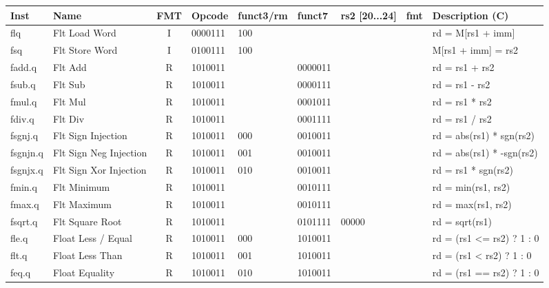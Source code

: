 \begin{center}
\begin{tabular}
{T | l | c | T | T | T | T | T | T } \hline
\rm Inst  & Name                  & FMT   & \rm Opcode & \rm funct3/rm & \rm funct7 & \rm rs2 [20...24] & \rm fmt & \rm Description (C)         \\ \hline
flq       & Flt Load Word         & I     & 0000111    & 100    &        &        & & rd = M[rs1 + imm]    \\
fsq       & Flt Store Word        & I     & 0100111    & 100    &        &        & & M[rs1 + imm] = rs2   \\
\hline
fadd.q    & Flt Add               & R     & 1010011    &        & 0000011 &        & & rd = rs1 + rs2       \\
fsub.q    & Flt Sub               & R     & 1010011    &        & 0000111 &        & & rd = rs1 - rs2       \\
fmul.q    & Flt Mul               & R     & 1010011    &        & 0001011 &        & & rd = rs1 * rs2       \\
fdiv.q    & Flt Div               & R     & 1010011    &        & 0001111 &        & & rd = rs1 / rs2       \\
fsgnj.q   & Flt Sign Injection    & R     & 1010011    & 000    & 0010011 &        & & rd = abs(rs1) * sgn(rs2) \\
fsgnjn.q  & Flt Sign Neg Injection& R     & 1010011    & 001    & 0010011 &        & & rd = abs(rs1) * -sgn(rs2) \\
fsgnjx.q  & Flt Sign Xor Injection& R     & 1010011    & 010    & 0010011 &        & & rd = rs1 * sgn(rs2)  \\
fmin.q    & Flt Minimum           & R     & 1010011    &        & 0010111 &        & & rd = min(rs1, rs2)   \\
fmax.q    & Flt Maximum           & R     & 1010011    &        & 0010111 &        & & rd = max(rs1, rs2)   \\
fsqrt.q   & Flt Square Root       & R     & 1010011    &        & 0101111 & 00000  & & rd = sqrt(rs1)       \\
\hline
fle.q     & Float Less / Equal    & R     & 1010011    & 000    & 1010011 &        & & rd = (rs1 <= rs2) ? 1 : 0\\
flt.q     & Float Less Than       & R     & 1010011    & 001    & 1010011 &        & & rd = (rs1 <  rs2) ? 1 : 0 \\
feq.q     & Float Equality        & R     & 1010011    & 010    & 1010011 &        & & rd = (rs1 == rs2) ? 1 : 0 \\

\end{tabular}
\end{center}
